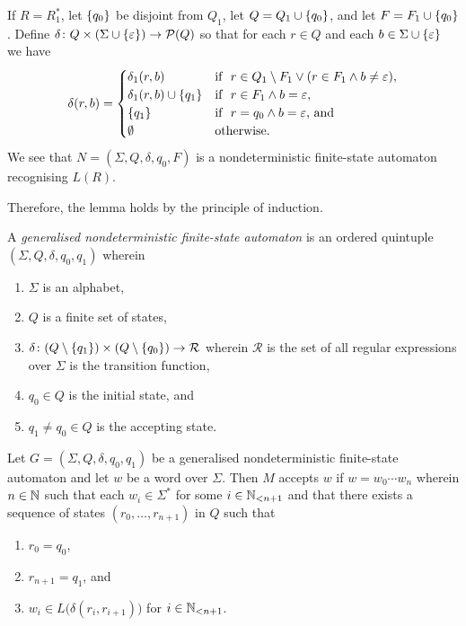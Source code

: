   If \(R = R_1^*\), let \(\set{q_0}\) be disjoint from \(Q_1\), let \(Q = Q_1 \cup \set{q_0}\), and let \(F = F_1
  \cup \set{q_0}\). Define \(\map{\delta}{Q \times (\Sigma \cup \set{\varepsilon})}{\pow(Q)}\) so that for each
  \(r \in Q\) and each \(b \in \Sigma \cup \set{\varepsilon}\) we have
  \[
    \delta(r, b) = \begin{cases}
      \delta_1(r, b) & \text{if }\ r \in Q_1 \setminus F_1 \lor (r \in F_1 \land b \neq \varepsilon),\\
      \delta_1(r, b) \cup \set{q_1} & \text{if }\ r \in F_1 \land b = \varepsilon,\\
      \set{q_1} & \text{if }\ r = q_0 \land b = \varepsilon \text{, and}\\
      \nset & \text{otherwise.}
    \end{cases}
  \]
  We see that \(N = (\Sigma, Q, \delta, q_0, F)\) is a nondeterministic finite-state automaton recognising \(L(R)\).

  Therefore, the lemma holds by the principle of induction.
\Epr

\Bdf
  A \emph{generalised nondeterministic finite-state automaton} is an ordered quintuple \((\Sigma, Q, \delta, q_0, q_1)\)
  wherein
  \begin{enumerate}
    \item \(\Sigma\) is an alphabet,
    \item \(Q\) is a finite set of states,
    \item \(\map{\delta}{(Q \setminus \set{q_1}) \times (Q \setminus \set{q_0})}{\mathcal{R}}\) wherein \(\mathcal{R}\)
    is the set of all regular expressions over \(\Sigma\) is the transition function,
    \item \(q_0 \in Q\) is the initial state, and
    \item \(q_1 \neq q_0 \in Q\) is the accepting state.
  \end{enumerate}
\Edf

Let \(G = (\Sigma, Q, \delta, q_0, q_1)\) be a generalised nondeterministic finite-state automaton and let \(w\) be a
word over \(\Sigma\). Then \(M\) accepts \(w\) if \(w = w_0 \cdots w_n\) wherein \(n \in \setnat\) such that each
\(w_i \in \Sigma^*\) for some \(i \in \Nln[n + 1]\) and that there exists a sequence of states \((r_0, \ldots,
r_{n + 1})\) in \(Q\) such that
\begin{enumerate}
  \item \(r_0 = q_0\),
  \item \(r_{n + 1} = q_1\), and
  \item \(w_i \in L\big(\delta(r_i, r_{i + 1})\big)\) for \(i \in \Nln[n + 1]\).
\end{enumerate}


